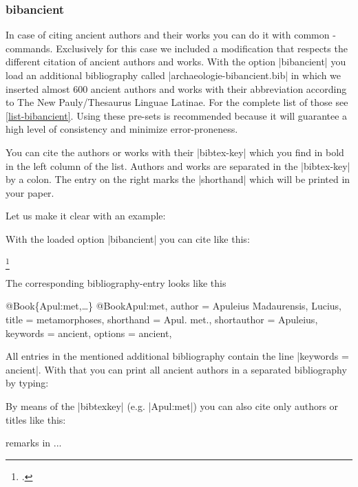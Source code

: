 \documentclass[a4paper,
10pt,
greek,
french,
spanish,
italian,
ngerman,
english
]{ltxdoc}
\begin{document}
\subsubsection{bibancient}\label{bibancient}
In case of citing ancient authors and their works you can do it with common -commands.
Exclusively for this case we included a modification that respects the different citation of ancient authors and works.
With the option |bibancient| you load an additional bibliography called |archaeologie-bibancient.bib| in which we inserted almost 600 ancient authors and works with their abbreviation according to The New Pauly/Thesaurus Linguae Latinae.
For the complete list of those see \cref{list-bibancient}.
Using these pre-sets is recommended because it will guarantee a high level of consistency and minimize error-proneness.

You can cite the authors or works with their |bibtex-key| which you find in bold in the left column of the list. 
Authors and works are separated in the |bibtex-key| by a colon.
The entry on the right marks the |shorthand| which will be printed in your paper.

Let us make it clear with an example:

With the loaded option |bibancient| you can cite like this:  


\begin{example}
\footnote{\cite[3,2,5--7]{Apul:met}.}
\end{example}


The corresponding bibliography-entry looks like this
\begin{bibexample}[label=Apul:met]{{@}Book\{Apul:met,…\}}
@Book{Apul:met,
  author      = {Apuleius Madaurensis, Lucius},
  title       = {metamorphoses},
  shorthand   = {Apul. met.},
  shortauthor = {Apuleius},
  keywords    = {ancient},
  options     = {ancient},
}
\end{bibexample}
All entries in the mentioned additional bibliography contain the line |keywords = {ancient}|.
With that you can print all ancient authors in a separated bibliography by typing:
\begin{code}
\printbibliography[keyword=ancient]
\end{code}

\begin{refsection}
By means of the |bibtexkey| (e.g. |Apul:met|) you can also cite only authors or titles like this: 


\begin{example}
\citeauthor{Apul:met} remarks in  ...
\end{example}

\end{refsection}
\end{document}
